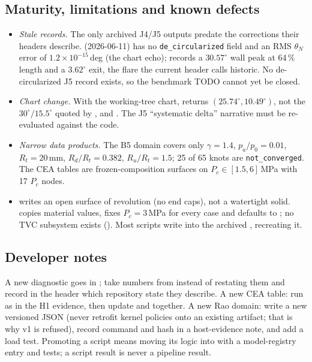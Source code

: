 \subsection{Maturity, limitations and known defects}
\begin{itemize}[nosep]
  \item \emph{Stale records.} The only archived J4/J5 outputs predate the corrections their headers describe.  (2026-06-11) has no \texttt{de\_circularized} field and an RMS $\theta_N$ error of $1.2\times10^{-15}$\,deg (the chart echo);  records a $30.57^\circ$ wall peak at 64\,\% length and a $3.62^\circ$ exit, the flare the current header calls historic. No de-circularized J5 record exists, so the benchmark TODO cannot yet be closed.
  \item \emph{Chart change.} With the working-tree chart,  returns $(25.74^\circ, 10.49^\circ)$, not the $30^\circ/15.5^\circ$ quoted by ,  and . The J5 ``systematic delta'' narrative must be re-evaluated against the code.
  \item \emph{Narrow data products.} The B5 domain covers only $\gamma=1.4$, $p_a/p_0=0.01$, $R_t=20$\,mm, $R_d/R_t=0.382$, $R_u/R_t=1.5$; 25 of 65 knots are \texttt{not\_converged}. The CEA tables are frozen-composition surfaces on $P_c\in[1.5,6]$\,MPa with 17 $P_c$ nodes.
  \item {} writes an open surface of revolution (no end caps), not a watertight solid.  copies material values, fixes $P_c=3$\,MPa for every case and defaults to ; no TVC subsystem exists (). Most scripts write into the archived , recreating it.
\end{itemize}

\subsection{Developer notes}
A new diagnostic goes in ; take numbers from  instead of restating them and record in the header which repository state they describe. A new CEA table: run  as in the H1 evidence, then update  and  together. A new Rao domain: write a new versioned JSON (never retrofit kernel policies onto an existing artifact; that is why v1 is refused), record command and hash in a host-evidence note, and add a load test. Promoting a script means moving its logic into  with a model-registry entry and tests; a script result is never a pipeline result.

